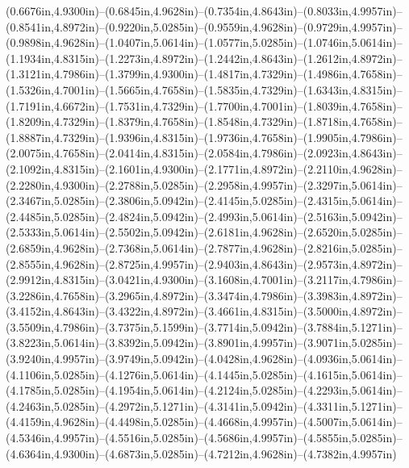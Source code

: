 (0.6676in,4.9300in)--(0.6845in,4.9628in)--(0.7354in,4.8643in)--(0.8033in,4.9957in)--(0.8541in,4.8972in)--(0.9220in,5.0285in)--(0.9559in,4.9628in)--(0.9729in,4.9957in)--(0.9898in,4.9628in)--(1.0407in,5.0614in)--(1.0577in,5.0285in)--(1.0746in,5.0614in)--(1.1934in,4.8315in)--(1.2273in,4.8972in)--(1.2442in,4.8643in)--(1.2612in,4.8972in)--(1.3121in,4.7986in)--(1.3799in,4.9300in)--(1.4817in,4.7329in)--(1.4986in,4.7658in)--(1.5326in,4.7001in)--(1.5665in,4.7658in)--(1.5835in,4.7329in)--(1.6343in,4.8315in)--(1.7191in,4.6672in)--(1.7531in,4.7329in)--(1.7700in,4.7001in)--(1.8039in,4.7658in)--(1.8209in,4.7329in)--(1.8379in,4.7658in)--(1.8548in,4.7329in)--(1.8718in,4.7658in)--(1.8887in,4.7329in)--(1.9396in,4.8315in)--(1.9736in,4.7658in)--(1.9905in,4.7986in)--(2.0075in,4.7658in)--(2.0414in,4.8315in)--(2.0584in,4.7986in)--(2.0923in,4.8643in)--(2.1092in,4.8315in)--(2.1601in,4.9300in)--(2.1771in,4.8972in)--(2.2110in,4.9628in)--(2.2280in,4.9300in)--(2.2788in,5.0285in)--(2.2958in,4.9957in)--(2.3297in,5.0614in)--(2.3467in,5.0285in)--(2.3806in,5.0942in)--(2.4145in,5.0285in)--(2.4315in,5.0614in)--(2.4485in,5.0285in)--(2.4824in,5.0942in)--(2.4993in,5.0614in)--(2.5163in,5.0942in)--(2.5333in,5.0614in)--(2.5502in,5.0942in)--(2.6181in,4.9628in)--(2.6520in,5.0285in)--(2.6859in,4.9628in)--(2.7368in,5.0614in)--(2.7877in,4.9628in)--(2.8216in,5.0285in)--(2.8555in,4.9628in)--(2.8725in,4.9957in)--(2.9403in,4.8643in)--(2.9573in,4.8972in)--(2.9912in,4.8315in)--(3.0421in,4.9300in)--(3.1608in,4.7001in)--(3.2117in,4.7986in)--(3.2286in,4.7658in)--(3.2965in,4.8972in)--(3.3474in,4.7986in)--(3.3983in,4.8972in)--(3.4152in,4.8643in)--(3.4322in,4.8972in)--(3.4661in,4.8315in)--(3.5000in,4.8972in)--(3.5509in,4.7986in)--(3.7375in,5.1599in)--(3.7714in,5.0942in)--(3.7884in,5.1271in)--(3.8223in,5.0614in)--(3.8392in,5.0942in)--(3.8901in,4.9957in)--(3.9071in,5.0285in)--(3.9240in,4.9957in)--(3.9749in,5.0942in)--(4.0428in,4.9628in)--(4.0936in,5.0614in)--(4.1106in,5.0285in)--(4.1276in,5.0614in)--(4.1445in,5.0285in)--(4.1615in,5.0614in)--(4.1785in,5.0285in)--(4.1954in,5.0614in)--(4.2124in,5.0285in)--(4.2293in,5.0614in)--(4.2463in,5.0285in)--(4.2972in,5.1271in)--(4.3141in,5.0942in)--(4.3311in,5.1271in)--(4.4159in,4.9628in)--(4.4498in,5.0285in)--(4.4668in,4.9957in)--(4.5007in,5.0614in)--(4.5346in,4.9957in)--(4.5516in,5.0285in)--(4.5686in,4.9957in)--(4.5855in,5.0285in)--(4.6364in,4.9300in)--(4.6873in,5.0285in)--(4.7212in,4.9628in)--(4.7382in,4.9957in) 
